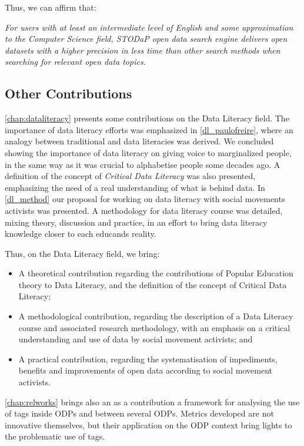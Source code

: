 Thus, we can affirm that:

\noindent \emph{For users with at least an intermediate level of English and some approximation to the Computer Science field, STODaP open data search engine delivers open datasets with a higher precision in less time than other search methods when searching for relevant open data topics.}

\subsection{Other Contributions}
\label{sec:other_contributions}

\autoref{chap:dataliteracy} presents some contributions on the Data Literacy field.
The importance of data literacy efforts was emphasized in \autoref{dl_paulofreire}, where an analogy between traditional and data literacies was derived.
We concluded showing the importance of data literacy on giving voice to marginalized people, in the same way as it was crucial to alphabetise people some decades ago.
A definition of the concept of \emph{Critical Data Literacy} was also presented, emphasizing the need of a real understanding of what is behind data.
In \autoref{dl_method} our proposal for working on data literacy with social movements activists was presented.
A methodology for data literacy course was detailed, mixing theory, discussion and practice, in an effort to bring data literacy knowledge closer to each educands reality.

Thus, on the Data Literacy field, we bring:
\begin{itemize}
	\item A theoretical contribution regarding the contributions of Popular Education theory to Data Literacy, and the definition of the concept of Critical Data Literacy;
	\item A methodological contribution, regarding the description of a Data Literacy course and associated research methodology, with an emphasis on a critical understanding and use of data by social movement activists; and
	\item A practical contribution, regarding the systematisation of impediments, benefits and improvements of open data according to social movement activists.
\end{itemize}

\autoref{chap:relworks} brings also an as a contribution a framework for analysing the use of tags inside ODPs and between several ODPs.
Metrics developed are not innovative themselves, but their application on the ODP context bring lights to the problematic use of tags.


